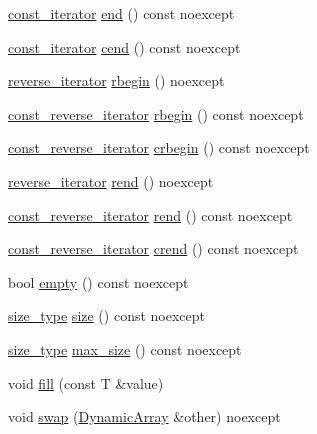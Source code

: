 \begin{DoxyCompactItemize}
\item 
\mbox{\hyperlink{classmage_1_1_dynamic_array_ad27aa1273eb102bbd596a13a00159001}{const\+\_\+iterator}} \mbox{\hyperlink{classmage_1_1_dynamic_array_ae179b8d9d6c5862c7857850202835d37}{end}} () const noexcept
\item 
\mbox{\hyperlink{classmage_1_1_dynamic_array_ad27aa1273eb102bbd596a13a00159001}{const\+\_\+iterator}} \mbox{\hyperlink{classmage_1_1_dynamic_array_a637a521283585da3797c9c78b767b87c}{cend}} () const noexcept
\item 
\mbox{\hyperlink{classmage_1_1_dynamic_array_a92d505734e8500e429d6b6e690b83dab}{reverse\+\_\+iterator}} \mbox{\hyperlink{classmage_1_1_dynamic_array_ab08c41e1d517fdf97a680d956e28ea2a}{rbegin}} () noexcept
\item 
\mbox{\hyperlink{classmage_1_1_dynamic_array_afbcc530c2cd68cc3b0474a4b1a5c6a15}{const\+\_\+reverse\+\_\+iterator}} \mbox{\hyperlink{classmage_1_1_dynamic_array_a13f1ae391363a64c50bd3ffbe3100d78}{rbegin}} () const noexcept
\item 
\mbox{\hyperlink{classmage_1_1_dynamic_array_afbcc530c2cd68cc3b0474a4b1a5c6a15}{const\+\_\+reverse\+\_\+iterator}} \mbox{\hyperlink{classmage_1_1_dynamic_array_a3aa7838e2609077168916c38295f37e3}{crbegin}} () const noexcept
\item 
\mbox{\hyperlink{classmage_1_1_dynamic_array_a92d505734e8500e429d6b6e690b83dab}{reverse\+\_\+iterator}} \mbox{\hyperlink{classmage_1_1_dynamic_array_a447aec6d8e826e3782ca3f92334a1fd0}{rend}} () noexcept
\item 
\mbox{\hyperlink{classmage_1_1_dynamic_array_afbcc530c2cd68cc3b0474a4b1a5c6a15}{const\+\_\+reverse\+\_\+iterator}} \mbox{\hyperlink{classmage_1_1_dynamic_array_a863a8608aea843d3620bcbc6d9038241}{rend}} () const noexcept
\item 
\mbox{\hyperlink{classmage_1_1_dynamic_array_afbcc530c2cd68cc3b0474a4b1a5c6a15}{const\+\_\+reverse\+\_\+iterator}} \mbox{\hyperlink{classmage_1_1_dynamic_array_a8cf78a785d961d9e90e57a060d46e03f}{crend}} () const noexcept
\item 
bool \mbox{\hyperlink{classmage_1_1_dynamic_array_ac8a35d1a6efc06808920af92317ee56e}{empty}} () const noexcept
\item 
\mbox{\hyperlink{classmage_1_1_dynamic_array_abae3236bcd8d1de414cbdf05219966b9}{size\+\_\+type}} \mbox{\hyperlink{classmage_1_1_dynamic_array_a18ac78a61310bc44493a15e69ca1f8f5}{size}} () const noexcept
\item 
\mbox{\hyperlink{classmage_1_1_dynamic_array_abae3236bcd8d1de414cbdf05219966b9}{size\+\_\+type}} \mbox{\hyperlink{classmage_1_1_dynamic_array_a6390fee671c148801f656c5a54d76096}{max\+\_\+size}} () const noexcept
\item 
void \mbox{\hyperlink{classmage_1_1_dynamic_array_af8f2f59a13d32635a6196857fb6cc2a4}{fill}} (const T \&value)
\item 
void \mbox{\hyperlink{classmage_1_1_dynamic_array_a43cb176cdff9d272b4b59584f572386b}{swap}} (\mbox{\hyperlink{classmage_1_1_dynamic_array}{Dynamic\+Array}} \&other) noexcept
\end{DoxyCompactItemize}
